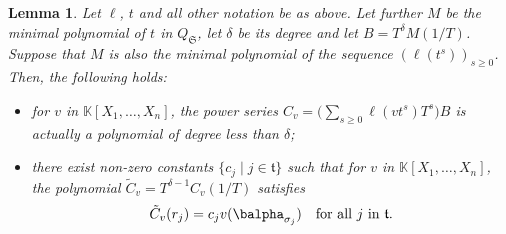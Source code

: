 \documentclass[12pt]{article}
\def\K {\ensuremath{\mathbb{K}}}
\newtheorem{Lemma}{Lemma}
\begin{document}
\begin{Lemma}
  Let $\ell$, $t$ and all other notation be as above. Let further
  $M$ be the minimal polynomial of $t$ in $Q_\mathfrak{S}$, let
  $\delta$ be its degree and let $B=T^\delta M(1/T)$. Suppose that 
  $M$ is also the minimal polynomial of the sequence $(\ell(t^s))_{s \ge 0}$.
  Then, the following holds:
  \begin{itemize}
  \item for $v$ in $\K[X_1,\dots,X_n]$, the power series $C_v =
    \Big(\sum_{s \ge 0} \ell(v t^s)T^s\Big)B$ is actually a polynomial
    of degree less than $\delta$;
  \item there exist non-zero constants $\{c_j \mid j \in
    \mathfrak{t}\}$  such that for $v$ in
    $\K[X_1,\dots,X_n]$, the polynomial $\tilde C_v = T^{\delta-1}
    C_v(1/T)$ satisfies
    $$\tilde C_v(r_j) = c_{j} v(\balpha_{\sigma_j}) \quad \text{for all $j$ in $\mathfrak{t}$.}$$
  \end{itemize}
\end{Lemma}
\end{document}
